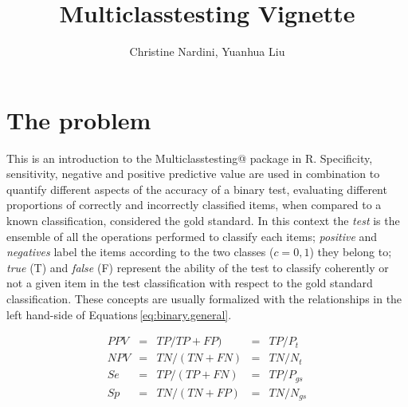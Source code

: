 \documentclass{article}
\begin{document}
\title{Multiclasstesting Vignette}
\author{Christine Nardini, Yuanhua Liu}
\maketitle


\section{The problem}

This is an introduction to the \verb@ Multiclasstesting@ package in R.  Specificity, sensitivity, negative and positive predictive value are used in combination to quantify different aspects of the accuracy of a binary test, evaluating different proportions of correctly and incorrectly classified items, when compared to a known classification, considered the gold standard. In this context the {\em test} is the ensemble of all the operations performed to classify each items; {\em positive} and {\em negatives} label the items according to the two classes ($c={0,1}$) they belong to; {\em true} (T) and {\em false} (F) represent the ability of the test to classify coherently or not a given item in the test classification with respect to the gold standard classification. 
These concepts are usually formalized with the  relationships in the left hand-side of Equations\,\ref{eq:binary.general}.

\begin{equation}\label{eq:binary.general}
\begin{array}{ccccc}
PPV & = &TP/TP+FP) & = &TP/ P_t\\
NPV & = &TN/(TN+FN)& = &TN/N_t\\
Se  & = &TP/(TP+FN)& = &TP/P_{gs}\\
Sp  & = &TN/(TN+FP)& = &TN/N_{gs}\\
\end{array}
\end{equation}
\end{document}
